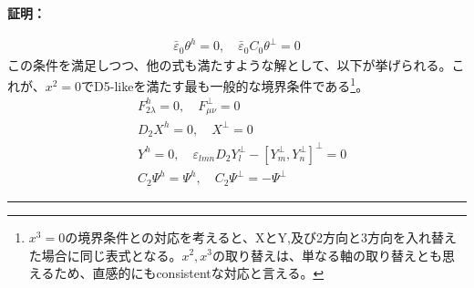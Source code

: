 \documentclass[dvipdfmx,a4paper,10.5pt]{article}
\numberwithin{equation}{section}
\newenvironment{proofbox}
{\begin{prooflabel}\textbf{証明：}\end{prooflabel}\vspace{0.8em}}
{\par\vspace{1em}\hrule\vspace{1em}}
\begin{document}
\begin{proofbox}
\begin{align*}
    \bar{\varepsilon}_{0}\theta^{h}=0,\quad \bar{\varepsilon}_{0}C_{0}\theta^{\perp}=0
\end{align*}
この条件を満足しつつ、他の式も満たすような解として、以下が挙げられる。これが、$x^{2}=0$でD5-likeを満たす最も一般的な境界条件である\footnote{$x^{3}=0$の境界条件との対応を考えると、XとY,及び2方向と3方向を入れ替えた場合に同じ表式となる。$x^{2},x^{3}$の取り替えは、単なる軸の取り替えとも思えるため、直感的にもconsistentな対応と言える。}。
\begin{align*}
&F^{h}_{2\lambda}=0,\quad F^{\perp}_{\mu\nu}=0\\
&D_{2}X^{h}=0,\quad X^{\perp}=0\\
&Y^{h}=0,\quad \varepsilon_{lmn}D_{2}Y_{l}^{\perp}-[Y_{m}^{\perp},Y_{n}^{\perp}]^{\perp}=0\\
&C_{2}\Psi^{h}=\Psi^{h},\quad C_{2}\Psi^{\perp}=-\Psi^{\perp}
\end{align*}
\end{proofbox}
\end{document}
